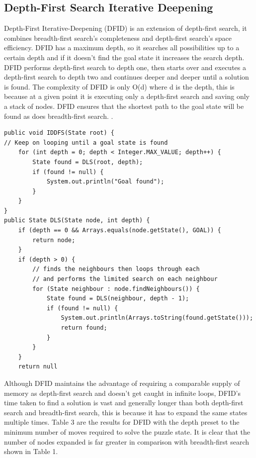 \documentclass[progress]{cmpreport}
\begin{document}
  
\subsection{Depth-First Search Iterative Deepening}
Depth-First Iterative-Deepening (DFID) is an extension of depth-first search, it combines breadth-first search's completeness and depth-first search's space efficiency. DFID has a maximum depth, so it searches all possibilities up to a certain depth and if it doesn't find the goal state it increases the search depth. DFID performs depth-first search to depth one, then starts over and executes a depth-first search to depth two and continues deeper and deeper until a solution is found. The complexity of DFID is only O(d) where d is the depth, this is because at a given point it is executing only a depth-first search and saving only a stack of nodes. DFID ensures that the shortest path to the goal state will be found as does breadth-first search. \citep{DBLP:conf/otm/MeissnerB11}.


\begin{verbatim}	
public void IDDFS(State root) {
// Keep on looping until a goal state is found
    for (int depth = 0; depth < Integer.MAX_VALUE; depth++) {
        State found = DLS(root, depth);
        if (found != null) {
            System.out.println("Goal found");
        }
    }
}
public State DLS(State node, int depth) {
    if (depth == 0 && Arrays.equals(node.getState(), GOAL)) {
        return node;
    }
    if (depth > 0) {
        // finds the neighbours then loops through each
        // and performs the limited search on each neighbour
        for (State neighbour : node.findNeighbours()) {
            State found = DLS(neighbour, depth - 1);
            if (found != null) {
                System.out.println(Arrays.toString(found.getState()));
                return found;
            }
        }
    }
    return null
\end{verbatim}

Although DFID maintains the advantage of requiring a comparable supply of memory as depth-first search and doesn't get caught in infinite loops, DFID's time taken to find a solution is vast and generally longer than both depth-first search and breadth-first search, this is because it has to expand the same states multiple times. Table 3 are the results for DFID with the depth preset to the minimum number of moves required to solve the puzzle state. It is clear that the number of nodes expanded is far greater in comparison with breadth-first search shown in Table 1.
\end{document}
